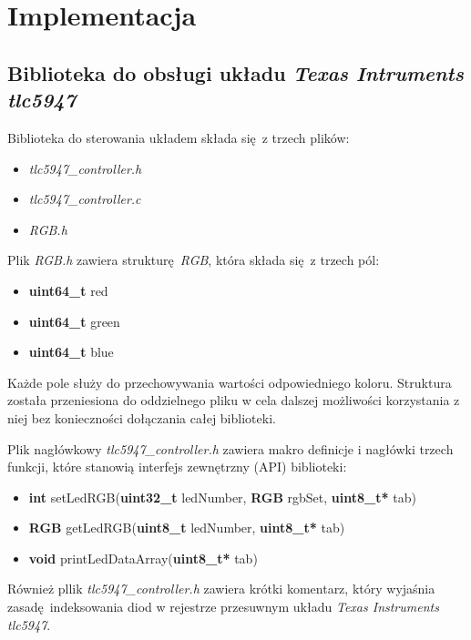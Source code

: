 \documentclass[eng,printmode]{mgr}
\begin{document}
\chapter{Implementacja}
\section{Biblioteka do obsługi układu \emph{Texas Intruments tlc5947}}

Biblioteka do sterowania układem składa się z trzech plików:

\begin{itemize}
  \item{\emph{tlc5947\_controller.h}}
  \item{\emph{tlc5947\_controller.c}}
  \item{\emph{RGB.h}}
\end{itemize}

Plik \emph{RGB.h} zawiera strukturę \emph{RGB}, która składa się z trzech pól:

\begin{itemize}[before=\ttfamily]
  \item{\textbf{uint64\_t} red}
  \item{\textbf{uint64\_t} green}
  \item{\textbf{uint64\_t} blue}
\end{itemize}

Każde pole służy do przechowywania wartości odpowiedniego koloru. Struktura została przeniesiona do oddzielnego pliku w cela dalszej możliwości korzystania z niej bez konieczności dołączania całej biblioteki.

\vspace{0.3cm}

Plik nagłówkowy \emph{tlc5947\_controller.h} zawiera makro definicje i nagłówki trzech funkcji, które stanowią interfejs zewnętrzny (API) biblioteki:

\begin{itemize}[before=\ttfamily]
  \item{\textbf{int} setLedRGB(\textbf{uint32\_t} ledNumber, \textbf{RGB} rgbSet, \textbf{uint8\_t*} tab)}
  \item{\textbf{RGB} getLedRGB(\textbf{uint8\_t} ledNumber, \textbf{uint8\_t*} tab)}
  \item{\textbf{void} printLedDataArray(\textbf{uint8\_t*} tab)}
\end{itemize}

Również pllik \emph{tlc5947\_controller.h} zawiera krótki komentarz, który wyjaśnia zasadę indeksowania diod w rejestrze przesuwnym układu \emph{Texas Instruments tlc5947}. 
\end{document}
